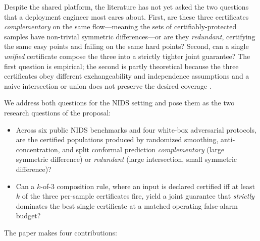 \documentclass[journal,twoside]{IEEEtran}
\begin{document}
Despite the shared platform, the literature has not yet asked the two
questions that a deployment engineer most cares about. First, are these
three certificates \emph{complementary} on the same flow---meaning the
sets of certifiably-protected samples have non-trivial symmetric
differences---or are they \emph{redundant}, certifying the same easy
points and failing on the same hard points? Second, can a single
\emph{unified} certificate compose the three into a strictly tighter
joint guarantee? The first question is empirical; the second is partly
theoretical because the three certificates obey different exchangeability
and independence assumptions and a naive intersection or union does not
preserve the desired coverage \cite{angelopoulos2023gentle,bates2023testing}.

We address both questions for the NIDS setting and pose them as the two
research questions of the proposal:

\begin{itemize}[leftmargin=1.5em]
  \item[\textbf{RQ1.}] Across six public NIDS benchmarks and four
        white-box adversarial protocols, are the certified populations
        produced by randomized smoothing, anti-concentration, and split
        conformal prediction \emph{complementary} (large symmetric
        difference) or \emph{redundant} (large intersection, small
        symmetric difference)?
  \item[\textbf{RQ2.}] Can a $k$-of-$3$ composition rule, where an
        input is declared certified iff at least $k$ of the three
        per-sample certificates fire, yield a joint guarantee that
        \emph{strictly} dominates the best single certificate at a
        matched operating false-alarm budget?
\end{itemize}

The paper makes four contributions:
\end{document}
